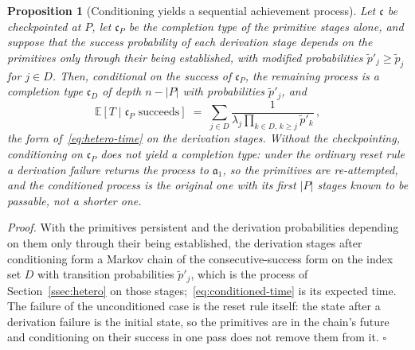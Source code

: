 \documentclass{article}
\newtheorem{proposition}{Proposition}
\begin{document}
\begin{proposition}[Conditioning yields a sequential achievement process]\label{prop:conditioning}
Let $\mathfrak{c}$ be checkpointed at $P$, let $\mathfrak{c}_P$ be the completion type of the primitive stages alone, and suppose that the success probability of each derivation stage depends on the primitives only through their being established, with modified probabilities $\widetilde{p}'_j \geq \widetilde{p}_j$ for $j \in D$. Then, conditional on the success of $\mathfrak{c}_P$, the remaining process is a completion type $\mathfrak{c}_D$ of depth $n - |P|$ with probabilities $\widetilde{p}'_j$, and
\begin{equation}\label{eq:conditioned-time}
  \mathbb{E}[T \mid \mathfrak{c}_P \text{ succeeds}] \;=\; \sum_{j \in D} \frac{1}{\lambda_j \prod_{k \in D,\, k \geq j} \widetilde{p}'_k}\,,
\end{equation}
the form of~\eqref{eq:hetero-time} on the derivation stages. Without the checkpointing, conditioning on $\mathfrak{c}_P$ does not yield a completion type: under the ordinary reset rule a derivation failure returns the process to $\mathfrak{a}_1$, so the primitives are re-attempted, and the conditioned process is the original one with its first $|P|$ stages known to be passable, not a shorter one.
\end{proposition}

\noindent\textit{Proof.} With the primitives persistent and the derivation probabilities depending on them only through their being established, the derivation stages after conditioning form a Markov chain of the consecutive-success form on the index set $D$ with transition probabilities $\widetilde{p}'_j$, which is the process of Section~\ref{ssec:hetero} on those stages;~\eqref{eq:conditioned-time} is its expected time. The failure of the unconditioned case is the reset rule itself: the state after a derivation failure is the initial state, so the primitives are in the chain's future and conditioning on their success in one pass does not remove them from it. $\square$
\end{document}
